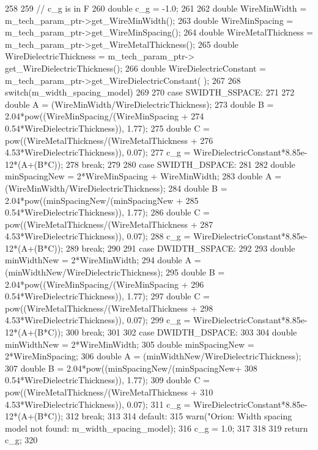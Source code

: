 \begin{DoxyCode}
258 {
259     // c_g is in F
260     double c_g = -1.0;
261 
262     double WireMinWidth = m_tech_param_ptr->get_WireMinWidth();
263     double WireMinSpacing = m_tech_param_ptr->get_WireMinSpacing();
264     double WireMetalThickness = m_tech_param_ptr->get_WireMetalThickness();
265     double WireDielectricThickness = m_tech_param_ptr->
      get_WireDielectricThickness();
266     double WireDielectricConstant = m_tech_param_ptr->get_WireDielectricConstant(
      );
267 
268     switch(m_width_spacing_model)
269     {
270         case SWIDTH_SSPACE:
271             {
272                 double A = (WireMinWidth/WireDielectricThickness);
273                 double B = 2.04*pow((WireMinSpacing/(WireMinSpacing +
274                                 0.54*WireDielectricThickness)), 1.77);
275                 double C = pow((WireMetalThickness/(WireMetalThickness +
276                                 4.53*WireDielectricThickness)), 0.07);
277                 c_g = WireDielectricConstant*8.85e-12*(A+(B*C)); 
278                 break;
279             }
280         case SWIDTH_DSPACE:
281             {
282                 double minSpacingNew = 2*WireMinSpacing + WireMinWidth;
283                 double A = (WireMinWidth/WireDielectricThickness);
284                 double B = 2.04*pow((minSpacingNew/(minSpacingNew +
285                                 0.54*WireDielectricThickness)), 1.77);
286                 double C = pow((WireMetalThickness/(WireMetalThickness +
287                                 4.53*WireDielectricThickness)), 0.07);
288                 c_g = WireDielectricConstant*8.85e-12*(A+(B*C));
289                 break;
290             }
291         case DWIDTH_SSPACE:
292             {
293                 double minWidthNew = 2*WireMinWidth;
294                 double A = (minWidthNew/WireDielectricThickness);
295                 double B = 2.04*pow((WireMinSpacing/(WireMinSpacing +
296                                 0.54*WireDielectricThickness)), 1.77);
297                 double C = pow((WireMetalThickness/(WireMetalThickness +
298                                 4.53*WireDielectricThickness)), 0.07);
299                 c_g = WireDielectricConstant*8.85e-12*(A+(B*C)); 
300                 break;
301             }
302         case DWIDTH_DSPACE:
303             {
304                 double minWidthNew = 2*WireMinWidth;
305                 double minSpacingNew = 2*WireMinSpacing;
306                 double A = (minWidthNew/WireDielectricThickness);
307                 double B = 2.04*pow((minSpacingNew/(minSpacingNew+
308                                 0.54*WireDielectricThickness)), 1.77);
309                 double C = pow((WireMetalThickness/(WireMetalThickness +
310                                 4.53*WireDielectricThickness)), 0.07);
311                 c_g = WireDielectricConstant*8.85e-12*(A+(B*C)); 
312                 break;
313             }
314         default:
315             warn("Orion: Width spacing model not found: %
      m_width_spacing_model);
316             c_g = 1.0;
317     }
318 
319     return c_g;
320 }
\end{DoxyCode}
